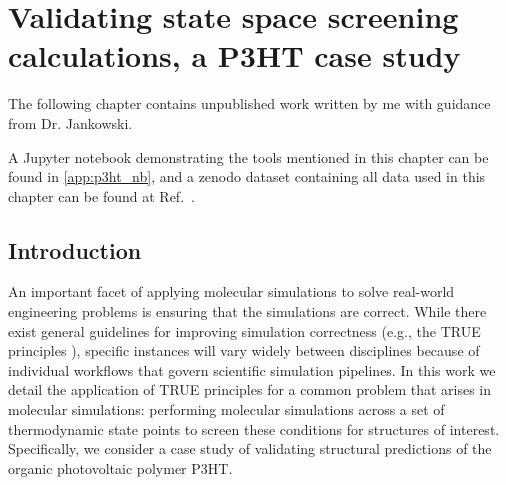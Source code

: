 \chapter{Validating state space screening calculations, a P3HT case study}
\label{chap:p3ht_validation}

The following chapter contains unpublished work written by me with guidance from Dr. Jankowski.


A Jupyter notebook demonstrating the tools mentioned in this chapter can be found in \autoref{app:p3ht_nb}, and a zenodo dataset containing all data used in this chapter can be found at Ref.~\citet{Fothergill2022}.

\section{Introduction}
An important facet of applying molecular simulations to solve real-world engineering problems is ensuring that the simulations are correct.
While there exist general guidelines for improving simulation correctness (e.g., the TRUE principles \cite{Thompson2020}), specific instances will vary widely between disciplines because of individual workflows that govern scientific simulation pipelines. 
In this work we detail the application of TRUE principles for a common problem that arises in molecular simulations: performing molecular simulations across a set of thermodynamic state points to screen these conditions for structures of interest. 
Specifically, we consider a case study of validating structural predictions of the organic photovoltaic polymer P3HT. 


